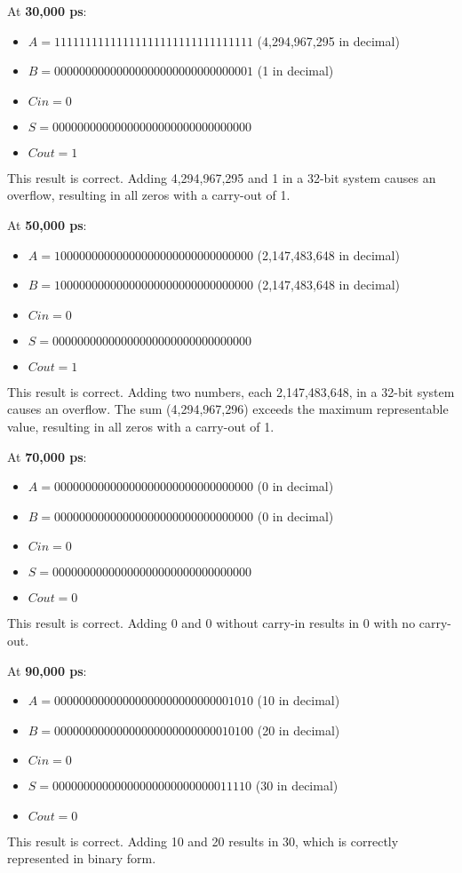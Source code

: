 \documentclass{IEEEtran}
\begin{document}
\vspace{0.5em}
\noindent At \textbf{30,000 ps}:  
\begin{itemize}
    \item \( A = 11111111111111111111111111111111 \) (4,294,967,295 in decimal)
    \item \( B = 00000000000000000000000000000001 \) (1 in decimal)
    \item \( Cin = 0 \)
    \item \( S = 00000000000000000000000000000000 \)
    \item \( Cout = 1 \)
\end{itemize}
This result is correct. Adding 4,294,967,295 and 1 in a 32-bit system causes an overflow, resulting in all zeros with a carry-out of 1.

\vspace{0.5em}
\noindent At \textbf{50,000 ps}:  
\begin{itemize}
    \item \( A = 10000000000000000000000000000000 \) (2,147,483,648 in decimal)
    \item \( B = 10000000000000000000000000000000 \) (2,147,483,648 in decimal)
    \item \( Cin = 0 \)
    \item \( S = 00000000000000000000000000000000 \)
    \item \( Cout = 1 \)
\end{itemize}
This result is correct. Adding two numbers, each 2,147,483,648, in a 32-bit system causes an overflow. The sum (4,294,967,296) exceeds the maximum representable value, resulting in all zeros with a carry-out of 1.

\vspace{0.5em}
\noindent At \textbf{70,000 ps}:  
\begin{itemize}
    \item \( A = 00000000000000000000000000000000 \) (0 in decimal)
    \item \( B = 00000000000000000000000000000000 \) (0 in decimal)
    \item \( Cin = 0 \)
    \item \( S = 00000000000000000000000000000000 \)
    \item \( Cout = 0 \)
\end{itemize}
This result is correct. Adding 0 and 0 without carry-in results in 0 with no carry-out.

\vspace{0.5em}
\noindent At \textbf{90,000 ps}:  
\begin{itemize}
    \item \( A = 00000000000000000000000000001010 \) (10 in decimal)
    \item \( B = 00000000000000000000000000010100 \) (20 in decimal)
    \item \( Cin = 0 \)
    \item \( S = 00000000000000000000000000011110 \) (30 in decimal)
    \item \( Cout = 0 \)
\end{itemize}
This result is correct. Adding 10 and 20 results in 30, which is correctly represented in binary form.
\end{document}
